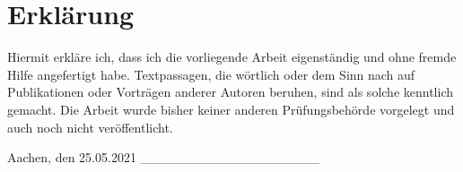 \hypertarget{erkluxe4rung}{%
\section{Erklärung}\label{erkluxe4rung}}

Hiermit erkläre ich, dass ich die vorliegende Arbeit eigenständig und
ohne fremde Hilfe angefertigt habe. Textpassagen, die wörtlich oder dem
Sinn nach auf Publikationen oder Vorträgen anderer Autoren beruhen, sind
als solche kenntlich gemacht. Die Arbeit wurde bisher keiner anderen
Prüfungsbehörde vorgelegt und auch noch nicht veröffentlicht.

Aachen, den 25.05.2021 \_\_\_\_\_\_\_\_\_\_\_\_\_\_\_\_\_\_\_
